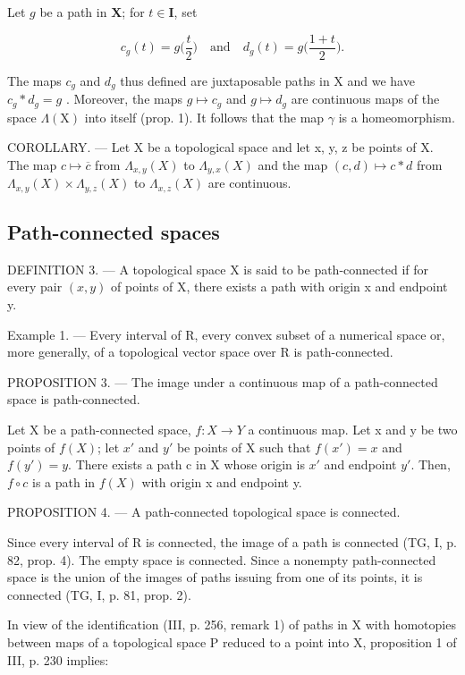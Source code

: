 Let \(g\) be a path in \(\mathbf{X}\); for \(t \in \mathbf{I}\), set

\[
c _ {g} (t) = g \bigl (\frac {t}{2} \bigr) \quad \text{and} \quad d _ {g} (t) = g \bigl (\frac {1 + t}{2} \bigr).
\]

The maps \(c_{g}\) and \(d_{g}\) thus defined are juxtaposable paths in X and we have \(c_{g} * d_{g} = g\) . Moreover, the maps \(g \mapsto c_{g}\) and \(g \mapsto d_{g}\) are continuous maps of the space \(\Lambda(\mathrm{X})\) into itself (prop. 1). It follows that the map \(\gamma\) is a homeomorphism.

COROLLARY. --- Let X be a topological space and let x, y, z be points of X. The map \(c \mapsto \overline{c}\) from \(\Lambda_{x,y}(X)\) to \(\Lambda_{y,x}(X)\) and the map \((c,d) \mapsto c * d\) from \(\Lambda_{x,y}(X) \times \Lambda_{y,z}(X)\) to \(\Lambda_{x,z}(X)\) are continuous.

\subsection{Path-connected spaces}

DEFINITION 3. --- A topological space X is said to be path-connected if for every pair \((x,y)\) of points of X, there exists a path with origin x and endpoint y.

Example 1. --- Every interval of R, every convex subset of a numerical space or, more generally, of a topological vector space over R is path-connected.

PROPOSITION 3. --- The image under a continuous map of a path-connected space is path-connected.

Let X be a path-connected space, \(f: X \to Y\) a continuous map. Let x and y be two points of \(f(X)\); let \(x'\) and \(y'\) be points of X such that \(f(x') = x\) and \(f(y') = y\). There exists a path c in X whose origin is \(x'\) and endpoint \(y'\). Then, \(f \circ c\) is a path in \(f(X)\) with origin x and endpoint y.

PROPOSITION 4. --- A path-connected topological space is connected.

Since every interval of R is connected, the image of a path is connected (TG, I, p. 82, prop. 4). The empty space is connected. Since a nonempty path-connected space is the union of the images of paths issuing from one of its points, it is connected (TG, I, p. 81, prop. 2).

In view of the identification (III, p. 256, remark 1) of paths in X with homotopies between maps of a topological space P reduced to a point into X, proposition 1 of III, p. 230 implies:

